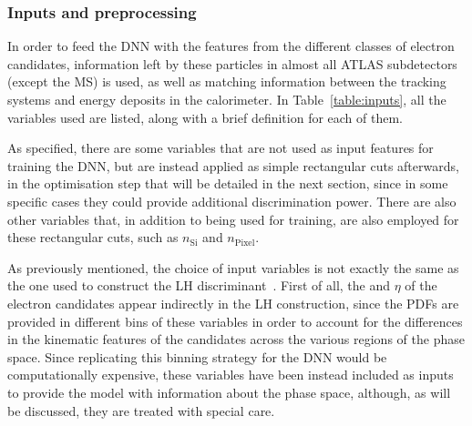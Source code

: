\subsubsection{Inputs and preprocessing}
\label{inputs_preproc}
In order to feed the DNN with the features from the different classes of electron candidates, information left by these particles in almost all ATLAS subdetectors (except the MS) is used, as well as matching information between the tracking systems and energy deposits in the calorimeter. 
In Table~\ref{table:inputs}, all the variables used are listed, along with a brief definition for each of them.

As specified, there are some variables that are not used as input features for training the DNN, but are instead applied as simple rectangular cuts afterwards, in the optimisation step that will be detailed in the next section, since in some specific cases they could provide additional discrimination power. There are also other variables that, in addition to being used for training, are also employed for these rectangular cuts, such as $n_{\text{Si}}$ and $n_{\text{Pixel}}$.

As previously mentioned, the choice of input variables is not exactly the same as the one used to construct the LH discriminant~\cite{Aaboud:2657964}. First of all, the \et and $\eta$ of the electron candidates appear indirectly in the LH construction, since the PDFs are provided in different bins of these variables in order to account for the differences in the kinematic features of the candidates across the various regions of the phase space. Since replicating this binning strategy for the DNN would be computationally expensive, these variables have been instead included as inputs to provide the model with information about the phase space, although, as will be discussed, they are treated with special care. \clearpage

